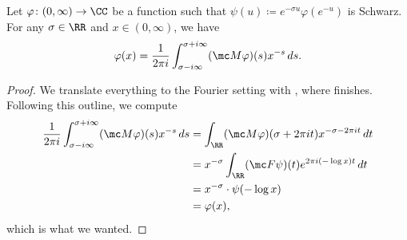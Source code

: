 \documentclass[../notes.tex]{subfiles}
\begin{document}
\begin{theorem} \label{thm:inv-mellin}
	Let $\varphi\colon(0,\infty)\to\CC$ be a function such that $\psi(u)\coloneqq e^{-\sigma u}\varphi\left(e^{-u}\right)$ is Schwarz. For any $\sigma\in\RR$ and $x\in(0,\infty)$, we have
	\[\varphi(x)=\frac1{2\pi i}\int_{\sigma-i\infty}^{\sigma+i\infty}(\mc M\varphi)(s)x^{-s}\,ds.\]
\end{theorem}
\begin{proof}
	We translate everything to the Fourier setting with , where  finishes. Following this outline, we compute
	\begin{align*}
		\frac1{2\pi i}\int_{\sigma-i\infty}^{\sigma+i\infty}(\mc M\varphi)(s)x^{-s}\,ds &= \int_\RR (\mc M\varphi)(\sigma+2\pi it)x^{-\sigma-2\pi it}\,dt \\
		&= x^{-\sigma}\int_\RR (\mc F\psi)(t)e^{2\pi i(-\log x)t}\,dt \\
		&= x^{-\sigma}\cdot\psi(-\log x) \\
		&= \varphi(x),
	\end{align*}
	which is what we wanted.
\end{proof}
\end{document}
